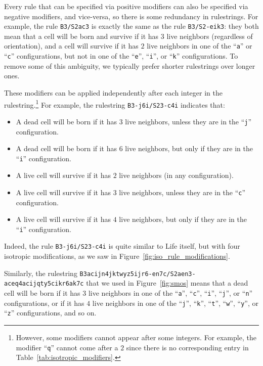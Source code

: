 Every rule that can be specified via positive modifiers can also be specified via negative modifiers, and vice-versa, so there is some redundancy in rulestrings. For example, the rule \texttt{B3/S2ac3} is exactly the same as the rule \texttt{B3/S2-eik3}: they both mean that a cell will be born and survive if it has $3$ live neighbors (regardless of orientation), and a cell will survive if it has $2$ live neighbors in one of the ``\texttt{a}'' or ``\texttt{c}'' configurations, but not in one of the ``\texttt{e}'', ``\texttt{i}'', or ``\texttt{k}'' configurations. To remove some of this ambiguity, we typically prefer shorter rulestrings over longer ones.

These modifiers can be applied independently after each integer in the rulestring.\footnote{However, some modifiers cannot appear after some integers. For example, the modifier ``\texttt{q}'' cannot come after a $2$ since there is no corresponding entry in Table~\ref{tab:isotropic_modifiers}.} For example, the rulestring \texttt{B3-j6i/S23-c4i} indicates that:\smallskip

\begin{itemize}
	\item A dead cell will be born if it has $3$ live neighbors, unless they are in the ``\texttt{j}'' configuration.\smallskip
	
	\item A dead cell will be born if it has $6$ live neighbors, but only if they are in the ``\texttt{i}'' configuration.\smallskip
	
	\item A live cell will survive if it has $2$ live neighbors (in any configuration).\smallskip
	
	\item A live cell will survive if it has $3$ live neighbors, unless they are in the ``\texttt{c}'' configuration.\smallskip
	
	\item A live cell will survive if it has $4$ live neighbors, but only if they are in the ``\texttt{i}'' configuration.\smallskip
\end{itemize}

\noindent Indeed, the rule \texttt{B3-j6i/S23-c4i} is quite similar to Life itself, but with four isotropic modifications, as we saw in Figure~\ref{fig:iso_rule_modifications}.

Similarly, the rulestring \texttt{B3acijn4jktwyz5ijr6-en7c/S2aen3-aceq4acijqty5cikr6ak7c} that we used in Figure~\ref{fig:smos} means that a dead cell will be born if it has $3$ live neighbors in one of the ``\texttt{a}'', ``\texttt{c}'', ``\texttt{i}'', ``\texttt{j}'', or ``\texttt{n}'' configurations, or if it has $4$ live neighbors in one of the ``\texttt{j}'', ``\texttt{k}'', ``\texttt{t}'', ``\texttt{w}'', ``\texttt{y}'', or ``\texttt{z}'' configurations, and so on.


